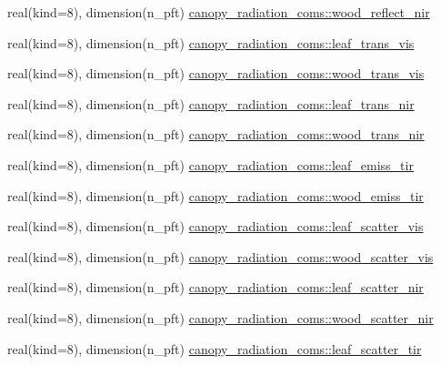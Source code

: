 \begin{DoxyCompactItemize}
\item 
real(kind=8), dimension(n\+\_\+pft) \hyperlink{namespacecanopy__radiation__coms_af020f9ae454b2719750aca108226147e}{canopy\+\_\+radiation\+\_\+coms\+::wood\+\_\+reflect\+\_\+nir}
\item 
real(kind=8), dimension(n\+\_\+pft) \hyperlink{namespacecanopy__radiation__coms_ab5495eba323c2fab375464eddc773362}{canopy\+\_\+radiation\+\_\+coms\+::leaf\+\_\+trans\+\_\+vis}
\item 
real(kind=8), dimension(n\+\_\+pft) \hyperlink{namespacecanopy__radiation__coms_add3e4a271e770993c7867304bd138bf2}{canopy\+\_\+radiation\+\_\+coms\+::wood\+\_\+trans\+\_\+vis}
\item 
real(kind=8), dimension(n\+\_\+pft) \hyperlink{namespacecanopy__radiation__coms_a83636a1072454a72163dea005f6695bf}{canopy\+\_\+radiation\+\_\+coms\+::leaf\+\_\+trans\+\_\+nir}
\item 
real(kind=8), dimension(n\+\_\+pft) \hyperlink{namespacecanopy__radiation__coms_ac71bbd6b94c73251f3181441d9930d48}{canopy\+\_\+radiation\+\_\+coms\+::wood\+\_\+trans\+\_\+nir}
\item 
real(kind=8), dimension(n\+\_\+pft) \hyperlink{namespacecanopy__radiation__coms_a248ba8c24adc6d99c25edf3176685c63}{canopy\+\_\+radiation\+\_\+coms\+::leaf\+\_\+emiss\+\_\+tir}
\item 
real(kind=8), dimension(n\+\_\+pft) \hyperlink{namespacecanopy__radiation__coms_a0c1f3270236f47702572f6378dc5c27d}{canopy\+\_\+radiation\+\_\+coms\+::wood\+\_\+emiss\+\_\+tir}
\item 
real(kind=8), dimension(n\+\_\+pft) \hyperlink{namespacecanopy__radiation__coms_abe59c68932814e1ebaf8c30137eec9bc}{canopy\+\_\+radiation\+\_\+coms\+::leaf\+\_\+scatter\+\_\+vis}
\item 
real(kind=8), dimension(n\+\_\+pft) \hyperlink{namespacecanopy__radiation__coms_a9d7ea3e034dbcde978fae2353feae644}{canopy\+\_\+radiation\+\_\+coms\+::wood\+\_\+scatter\+\_\+vis}
\item 
real(kind=8), dimension(n\+\_\+pft) \hyperlink{namespacecanopy__radiation__coms_a7f239d8adc86bab8014bb6f96dac2eb7}{canopy\+\_\+radiation\+\_\+coms\+::leaf\+\_\+scatter\+\_\+nir}
\item 
real(kind=8), dimension(n\+\_\+pft) \hyperlink{namespacecanopy__radiation__coms_ab34f58c9789b2913a92e5c2d17b7fd6c}{canopy\+\_\+radiation\+\_\+coms\+::wood\+\_\+scatter\+\_\+nir}
\item 
real(kind=8), dimension(n\+\_\+pft) \hyperlink{namespacecanopy__radiation__coms_a7574590f5e0778766955f748399b442b}{canopy\+\_\+radiation\+\_\+coms\+::leaf\+\_\+scatter\+\_\+tir}

\end{DoxyCompactItemize}
